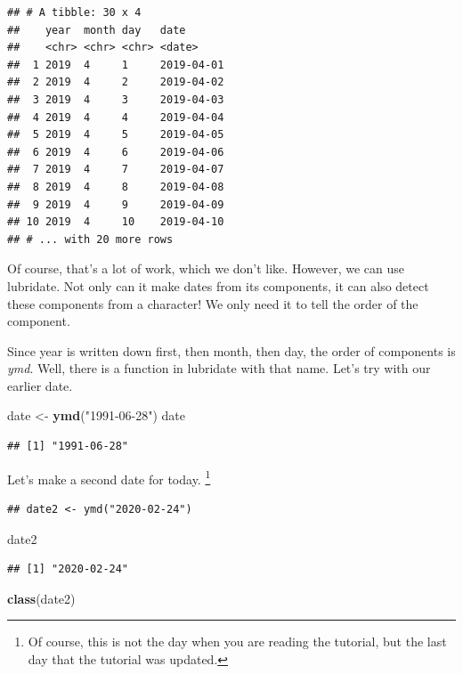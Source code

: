 \documentclass[]{tufte-book}
\newenvironment{Shaded}{}{}
\newcommand{\KeywordTok}[1]{\textcolor[rgb]{0.00,0.44,0.13}{\textbf{#1}}}
\newcommand{\NormalTok}[1]{#1}
\newcommand{\StringTok}[1]{\textcolor[rgb]{0.25,0.44,0.63}{#1}}
\begin{document}
\begin{verbatim}
## # A tibble: 30 x 4
##    year  month day   date      
##    <chr> <chr> <chr> <date>    
##  1 2019  4     1     2019-04-01
##  2 2019  4     2     2019-04-02
##  3 2019  4     3     2019-04-03
##  4 2019  4     4     2019-04-04
##  5 2019  4     5     2019-04-05
##  6 2019  4     6     2019-04-06
##  7 2019  4     7     2019-04-07
##  8 2019  4     8     2019-04-08
##  9 2019  4     9     2019-04-09
## 10 2019  4     10    2019-04-10
## # ... with 20 more rows
\end{verbatim}

Of course, that's a lot of work, which we don't like. However, we can use lubridate. Not only can it make dates from its components, it can also detect these components from a character! We only need it to tell the order of the component.

Since year is written down first, then month, then day, the order of components is \emph{ymd}. Well, there is a function in lubridate with that name. Let's try with our earlier date.

\begin{Shaded}
\begin{Highlighting}[]
\NormalTok{date <-}\StringTok{ }\KeywordTok{ymd}\NormalTok{(}\StringTok{"1991-06-28"}\NormalTok{)}
\NormalTok{date}
\end{Highlighting}
\end{Shaded}

\begin{verbatim}
## [1] "1991-06-28"
\end{verbatim}

Let's make a second date for today. \footnote{Of course, this is not the day when you are reading the tutorial, but the last day that the tutorial was updated.}

\begin{verbatim}
## date2 <- ymd("2020-02-24")
\end{verbatim}

\begin{Shaded}
\begin{Highlighting}[]
\NormalTok{date2}
\end{Highlighting}
\end{Shaded}

\begin{verbatim}
## [1] "2020-02-24"
\end{verbatim}

\begin{Shaded}
\begin{Highlighting}[]
\KeywordTok{class}\NormalTok{(date2)}
\end{Highlighting}
\end{Shaded}
\end{document}
